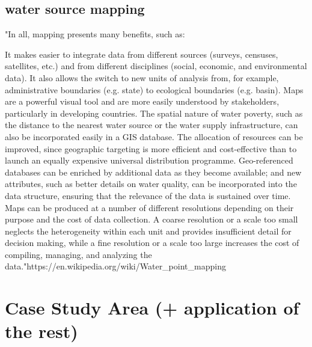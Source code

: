 {\subsubsection{}


\subsection{water source mapping}
"In all, mapping presents many benefits, such as:

It makes easier to integrate data from different sources (surveys, censuses, satellites, etc.) and from different disciplines (social, economic, and environmental data). It also allows the switch to new units of analysis from, for example, administrative boundaries (e.g. state) to ecological boundaries (e.g. basin).
Maps are a powerful visual tool and are more easily understood by stakeholders, particularly in developing countries.
The spatial nature of water poverty, such as the distance to the nearest water source or the water supply infrastructure, can also be incorporated easily in a GIS database.
The allocation of resources can be improved, since geographic targeting is more efficient and cost-effective than to launch an equally expensive universal distribution programme.
Geo-referenced databases can be enriched by additional data as they become available; and new attributes, such as better details on water quality, can be incorporated into the data structure, ensuring that the relevance of the data is sustained over time.
Maps can be produced at a number of different resolutions depending on their purpose and the cost of data collection. A coarse resolution or a scale too small neglects the heterogeneity within each unit and provides insufficient detail for decision making, while a fine resolution or a scale too large increases the cost of compiling, managing, and analyzing the data."https://en.wikipedia.org/wiki/Water_point_mapping



\section{Case Study Area (+ application of the rest)}


}
